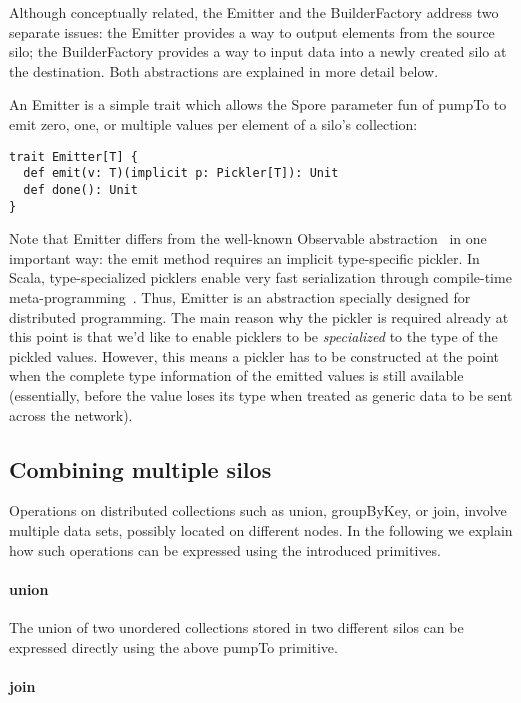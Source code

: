 \documentclass{easychair}
\begin{document}
Although conceptually related, the Emitter and the BuilderFactory address two
separate issues: the Emitter provides a way to output elements from the source
silo; the BuilderFactory provides a way to input data into a newly created
silo at the destination. Both abstractions are explained in more detail below.

An Emitter is a simple trait which allows the Spore parameter fun of pumpTo to
emit zero, one, or multiple values per element of a silo's collection:

\begin{verbatim}
trait Emitter[T] {
  def emit(v: T)(implicit p: Pickler[T]): Unit
  def done(): Unit
}
\end{verbatim}
\noindent
Note that Emitter differs from the well-known Observable abstraction~\cite{Meijer12}
in one important way: the emit method requires an implicit type-specific
pickler. In Scala, type-specialized picklers enable very fast serialization
through compile-time meta-programming~\cite{MillerHBO13}. Thus, Emitter is an
abstraction specially designed for distributed programming. The main reason
why the pickler is required already at this point is that we'd like to enable
picklers to be \emph{specialized} to the type of the pickled values. However,
this means a pickler has to be constructed at the point when the complete type
information of the emitted values is still available (essentially, before the
value loses its type when treated as generic data to be sent across the
network).

\subsection{Combining multiple silos}

Operations on distributed collections such as union, groupByKey, or join,
involve multiple data sets, possibly located on different nodes. In the
following we explain how such operations can be expressed using the introduced
primitives.

\paragraph{union}

The union of two unordered collections stored in two different silos can be
expressed directly using the above pumpTo primitive.

\paragraph{join}
\end{document}
